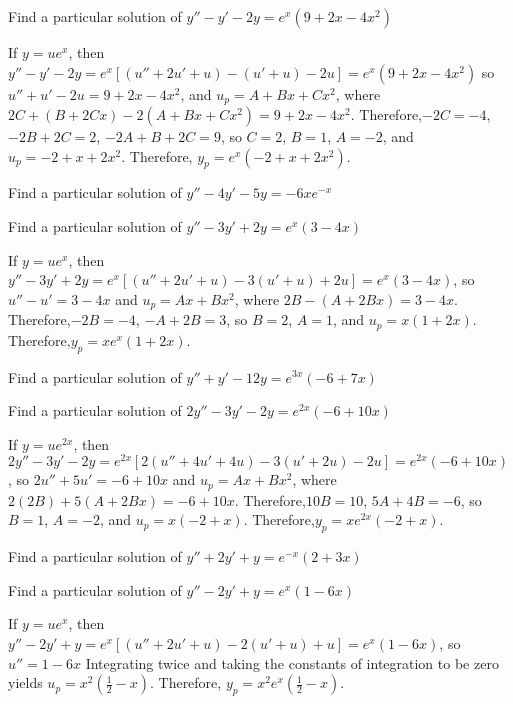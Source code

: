 \documentclass{ximera}
\begin{document}
\begin{problem}\label{exer:5.4.6} Find a particular
solution of $y''-y'-2y=e^x(9+2x-4x^2)$
\begin{solution}
If $y=ue^x$, then $y''-y'-2y=e^x\left[(u''+2u'+u)-(u'+u)-2u\right]=
e^x(9+2x-4x^2)$ so $u''+u'-2u =9+2x-4x^2$, and $u_p=A+Bx+Cx^2$, where
$2C+(B+2Cx)-2(A+Bx+Cx^2)=9+2x-4x^2$. Therefore,$-2C=-4$, $-2B+2C=2$,
$-2A+B+2C=9$, so $C=2$, $B=1$, $A=-2$, and $u_p=-2+x+2x^2$. Therefore,
$y_p=e^x(-2+x+2x^2)$.
\end{solution}
\end{problem}

\begin{problem}\label{exer:5.4.7} Find a particular
solution of $y''-4y'-5y=-6xe^{-x}$
\end{problem}

\begin{problem}\label{exer:5.4.8} Find a particular
solution of $y''-3y'+2y=e^x(3-4x)$
\begin{solution}
If $y=ue^x$, then $y''-3y'+2y=e^x\left[(u''+2u'+u)-3(u'+u)+2u\right]=
e^x(3-4x)$, so $u''-u'=3-4x$ and $u_p=Ax+Bx^2$, where
$2B-(A+2Bx)=3-4x$. Therefore,$-2B=-4$, $-A+2B=3$, so $B=2$, $A=1$, and
$u_p=x(1+2x)$. Therefore,$y_p=xe^x(1+2x)$.
\end{solution}
\end{problem}

\begin{problem}\label{exer:5.4.9} Find a particular
solution of $y''+y'-12y=e^{3x}(-6+7x)$
\end{problem}

\begin{problem}\label{exer:5.4.10} Find a particular
solution of $2y''-3y'-2y=e^{2x}(-6+10x)$
\begin{solution}
If $y=ue^{2x}$, then
$2y''-3y'-2y=e^{2x}\left[2(u''+4u'+4u)-3(u'+2u)-2u\right]=
e^{2x}(-6+10x)$, so $2u''+5u'=-6+10x$ and $u_p=Ax+Bx^2$, where
$2(2B)+5(A+2Bx)=-6+10x$. Therefore,$10B=10$, $5A+4B=-6$, so $B=1$,
$A=-2$, and $u_p=x(-2+x)$. Therefore,$y_p=xe^{2x}(-2+x)$.
\end{solution}
\end{problem}

\begin{problem}\label{exer:5.4.11} Find a particular
solution of $y''+2y'+y=e^{-x}(2+3x)$ 
\end{problem}

\begin{problem}\label{exer:5.4.12} Find a particular
solution of $y''-2y'+y=e^x(1-6x)$
\begin{solution}
If $y=ue^x$, then $y''-2y'+y=e^x\left[(u''+2u'+u)-2(u'+u)+u\right]=
e^x(1-6x)$, so $u''=1-6x$ Integrating twice and taking the constants
of integration to be zero yields
$u_p=x^2\left(\frac{1}{2}-x\right)$. Therefore,
$y_p=x^2e^x\left(\frac{1}{2}-x\right)$.
\end{solution}
\end{problem}
\end{document}
